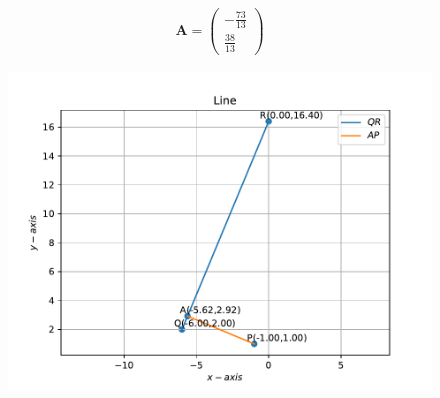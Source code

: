 \documentclass[12pt]{article}
\newcommand{\myvec}[1]{\ensuremath{\begin{pmatrix}#1\end{pmatrix}}}
\let\vec\mathbf
\begin{document}
\begin{enumerate}
\begin{enumerate}
\begin{align}
	\vec{A} = \myvec{ -\frac{73}{13} \\ \frac{38}{13} }
\end{align}
\end{enumerate}
\begin{figure}[!h]
	\begin{center}
		\includegraphics[width=\columnwidth]{./figs/problem4.pdf}
	\end{center}
\caption{}
\label{fig:Fig1}
\end{figure}
\end{enumerate}
\end{document}
